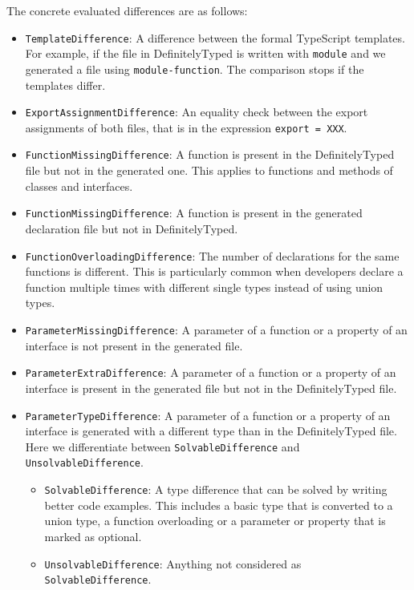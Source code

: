 \documentclass[a4paper,english,cleveref, autoref]{lipics-v2019}
\begin{document}
The concrete evaluated differences are as follows:
\begin{itemize}
  \item \texttt{TemplateDifference}: A difference between the formal TypeScript templates. For example, if the file in DefinitelyTyped is written with \texttt{module} and we generated a file using \texttt{module-function}. The comparison stops if the templates differ.
  \item \texttt{ExportAssignmentDifference}: An equality check between the export assignments of both files, that is in the expression \lstinline{export = XXX}.
  \item \texttt{FunctionMissingDifference}: A function is present in the DefinitelyTyped file but not in the generated one. This applies to functions and methods of classes and interfaces.
  \item \texttt{FunctionMissingDifference}: A function is present in the generated declaration file but not in DefinitelyTyped.
  \item \texttt{FunctionOverloadingDifference}: The number of declarations for the same functions is different. This is particularly common when developers declare a function multiple times with different single types instead of using union types.
  \item \texttt{ParameterMissingDifference}: A parameter of a function or a property of an interface is not present in the generated file.
  \item \texttt{ParameterExtraDifference}: A parameter of a function or a property of an interface is present in the generated file but not in the DefinitelyTyped file.
  \item \texttt{ParameterTypeDifference}: A parameter of a function or a property of an interface is generated with a different type than in the DefinitelyTyped file. Here we differentiate between \texttt{SolvableDifference} and \texttt{UnsolvableDifference}.
  \begin{itemize}
    \item \texttt{SolvableDifference}: A type difference that can be solved by writing better code examples. This includes a basic type that is converted to a union type, a function overloading or a parameter or property that is marked as optional.
    \item \texttt{UnsolvableDifference}: Anything not considered as \texttt{SolvableDifference}.
  \end{itemize}
\end{itemize}
\end{document}
